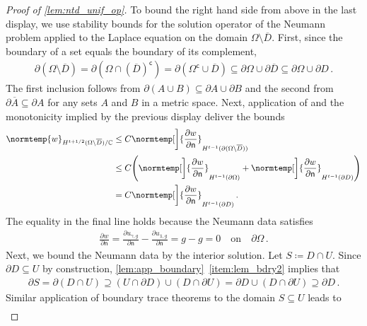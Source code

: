 \documentclass[pdflatex,sn-mathphys-num]{sn-jnl-preprint}
\let\originalleft\left %
\let\originalright\right
\renewcommand{\left}{\mathopen{}\mathclose\bgroup\originalleft}
\renewcommand{\right}{\aftergroup\egroup\originalright}
\newcommand{\C}{\mathbb{C}}
\newcommand{\pOmega}{{\partial\Omega}}
\newcommand{\norm}{\normtemp}
\newcommand{\defeq}{\coloneqq} %
\newcommand{\comp}{\textsf{c}} %
\newcommand{\onebm}{\mathds{1}} %
\def\qon{\quad\text{on}\quad}
\theoremstyle{thmstyleone}%
\theoremstyle{thmstyletwo}%
\theoremstyle{thmstylethree}%
\numberwithin{equation}{section}
\numberwithin{theorem}{section}
\begin{document}
\begin{appendices}
\begin{proof}[Proof of \cref{lem:ntd_unif_op}]
	To bound the right hand side from above in the last display, we use stability bounds for the solution operator of the Neumann problem applied to the Laplace  equation on the domain $\Omega\setminus\overline{D}$. First, since the boundary of a set equals the boundary of its complement,
	\begin{align*}
		\partial(\Omega\setminus\overline{D}) = \partial(\Omega \cap (\overline{D})^\comp)=\partial(\Omega^\comp\cup \overline{D}) \subseteq \partial \Omega \cup \partial \overline{D}\subseteq \partial \Omega \cup \partial D\,.
	\end{align*}
	The first inclusion follows from $\partial(A\cup B)\subseteq \partial A\cup \partial B$ and the second from $\partial\overline{A}\subseteq \partial A$ for any sets $A$ and $B$ in a metric space. Next, application of \cite[Chp.~2, Remark 7.2, pp.~188--189, taking $\Omega=\Omega\setminus\overline{D}$, $A=-\Delta$, $f\equiv 0$, $s=t+1/2$, $m=m_0=1$, and $N=\{z\onebm\colon z\in\C\}$]{lions2012non} and the monotonicity implied by the previous display deliver the bounds
	\begin{align*}
		\norm{w}_{H^{t+1/2}(\Omega\setminus\overline{D})/\C}&\leq C \norm[\bigg]{\frac{\partial w}{\partial\mathsf{n}}}_{H^{t-1}(\partial(\Omega\setminus\overline{D}))}\\
		&\leq C\left(\norm[\bigg]{\frac{\partial w}{\partial\mathsf{n}}}_{H^{t-1}(\partial\Omega)} + \norm[\bigg]{\frac{\partial w}{\partial\mathsf{n}}}_{H^{t-1}(\partial D)}\right)\\
		&= C\norm[\bigg]{\frac{\partial w}{\partial\mathsf{n}}}_{H^{t-1}(\partial D)}\,.
	\end{align*}
	The equality in the final line holds because the Neumann data satisfies 
	\begin{align*}
		\frac{\partial w}{\partial\mathsf{n}}=\frac{\partial u_{\gamma,g}}{\partial\mathsf{n}}-\frac{\partial u_{\onebm,g}}{\partial\mathsf{n}}=g-g=0 \qon \pOmega\,.
	\end{align*}
	Next, we bound the Neumann data by the interior solution. Let $S\defeq D\cap U$. Since $\partial D\subseteq U$ by construction, \cref{lem:app_boundary}~\ref{item:lem_bdry2} implies that 
	\begin{align*}
		\partial S=\partial(D\cap U)\supseteq (U\cap\partial D)\cup(D\cap\partial U)=\partial D \cup(D\cap\partial U)\supseteq \partial D\,.
	\end{align*}
	Similar application of boundary trace theorems to the domain $S\subseteq U$ leads to
	\begin{align*}

\end{align*}
\end{proof}
\end{appendices}
\end{document}
